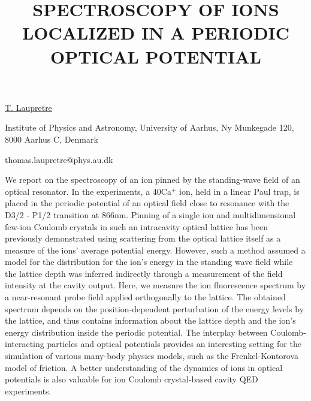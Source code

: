 \title{SPECTROSCOPY OF IONS LOCALIZED IN A PERIODIC OPTICAL POTENTIAL}

\underline{T. Laupretre} 

{\normalsize{\vspace{-4mm}
Institute of Physics and Astronomy,
University of Aarhus,
Ny Munkegade 120,
8000 Aarhus C,
Denmark

\email thomas.laupretre@phys.au.dk}}

We report on the spectroscopy of an ion pinned by the standing-wave field of an optical resonator. In the experiments, a 40Ca$^{+}$ ion, held in a linear Paul trap, is placed in the periodic potential of an optical field close to resonance with the D3/2 - P1/2  transition at 866nm. Pinning of a single ion and multidimensional few-ion Coulomb crystals in such an intracavity optical lattice has been previously demonstrated using scattering from the optical lattice itself as a measure of the ions’ average potential energy. However, such a method assumed a model for the distribution for the ion’s energy in the standing wave field while the lattice depth was inferred indirectly through a measurement of the field intensity at the cavity output. Here, we measure the ion fluorescence spectrum by a near-resonant probe field applied orthogonally to the lattice. The obtained spectrum depends on the position-dependent perturbation of the energy levels by the lattice, and thus contains information about the lattice depth and the ion’s energy distribution inside the periodic potential.
The interplay between Coulomb-interacting particles and optical potentials provides an interesting setting for the simulation of various many-body physics models, such as the Frenkel-Kontorova model of friction. A better understanding of the dynamics of ions in optical potentials is also valuable for ion Coulomb crystal-based cavity QED experiments.


\vspace{\baselineskip}

